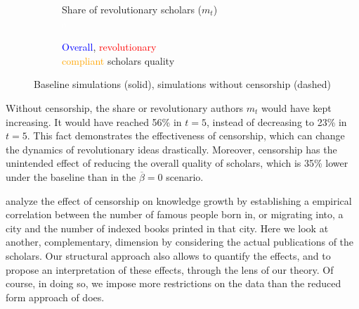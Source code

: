 \begin{figure}[htb]	
	\centering
	\hspace*{-1cm}
	\begin{subfigure}{.49\textwidth}
		\centering
		\caption{Share of revolutionary scholars ($m_t$)\\\textcolor{white}{a}}
		\label{sf:ra}
		\scalebox{0.55}{ }
	\end{subfigure}\hspace{-5mm}
	\begin{subfigure}{.49\textwidth}
		\centering
		\caption{\textcolor{blue}{Overall}, \textcolor{red}{revolutionary}\\ \textcolor{orange}{compliant} scholars quality}
		\label{sf:dq}
		\scalebox{0.55}{ }
	\end{subfigure}

	\caption{Baseline simulations (solid), simulations without censorship (dashed)}
	\label{fig:exp}
\end{figure}



Without censorship, the share or revolutionary authors $m_t$ would have kept increasing. It would have reached 56\% in $t=5$, instead of decreasing to 23\% in $t=5$. This fact demonstrates the effectiveness of censorship, which can change the dynamics of revolutionary ideas drastically. Moreover, censorship has the unintended effect of reducing the overall quality of scholars, which is 35\% lower under the baseline than in the $\overline{\beta}=0$ scenario.

 analyze the effect of censorship on knowledge growth by establishing a empirical correlation between
 the number of famous people born in, or migrating into, a city and the number of indexed books printed in that city. Here we look at another, complementary, dimension by considering the actual publications of the scholars. Our structural approach also allows to quantify the effects, and to propose an interpretation of these effects, through the lens of our theory. Of course, in doing so, we impose more restrictions on the data than the reduced form approach of    does.

